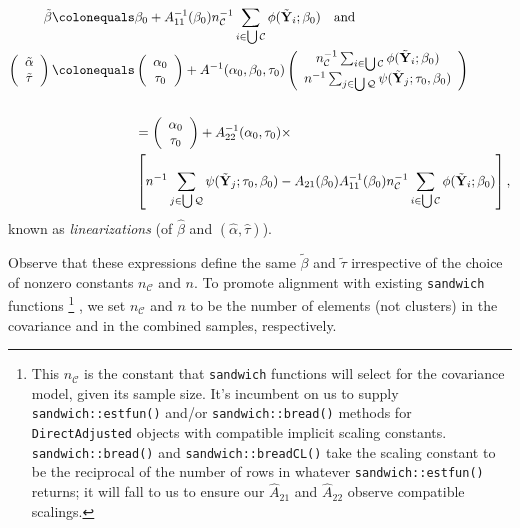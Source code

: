 \documentclass{article}
\newcommand{\defeq}{\ensuremath{\colonequals}}
\begin{document}
  \begin{align*}
   \tilde\beta
    \defeq& \beta_{0} + A_{11}^{-1}(\beta_{0})n_{\mathcal{C}}^{-1}\sum_{i\in \bigcup \mathcal{C}}\phi(\tilde{\mathbf{Y}}_{i}; \beta_{0})
  \quad \text{and}\\
    \left(\begin{array}{c}\tilde\alpha\\ \tilde\tau \end{array}\right)
    \defeq& \left(\begin{array}{c}\alpha_{0}\\
                    \tau_{0} \end{array}\right)
    + A^{-1}(\alpha_{0}, \beta_{0}, \tau_{0})\left(
    \begin{array}{c}
      n_{\mathcal{C}}^{-1}\sum_{i\in \bigcup
      \mathcal{C}}\phi(\tilde{\mathbf{Y}}_{i}; \beta_{0})\\
      n^{-1}\sum_{j\in \bigcup
                 \mathcal{Q}}\psi(\tilde{\mathbf{Y}}_{j};
                 \tau_{0},\beta_{0} )
    \end{array}
\right)\\
    \\
               &=\left(\begin{array}{c}\alpha_{0}\\
                         \tau_{0} \end{array}\right) +
    A_{22}^{-1}(\alpha_{0}, \tau_{0})\times \\
    & \left[
                 n^{-1}\sum_{j\in \bigcup
                 \mathcal{Q}}\psi(\tilde{\mathbf{Y}}_{j};
                 \tau_{0},\beta_{0} ) - A_{21}(\beta_{0}) A_{11}^{-1}(\beta_{0})n_{\mathcal{C}}^{-1}\sum_{i\in \bigcup \mathcal{C}}\phi(\tilde{\mathbf{Y}}_{i}; \beta_{0})\right],
\end{align*}
known as \textit{linearizations} (of $\hat\beta$ and $(\hat\alpha, \hat\tau)$).


Observe that these expressions define the same $\tilde\beta$ and $\tilde\tau$
  irrespective of the choice of nonzero constants $n_{\mathcal{C}}$
  and $n$.  To promote alignment with existing \texttt{sandwich}
  functions%
  \footnote{%
    This $n_{\mathcal{C}}$ is the constant that \texttt{sandwich} functions
will select for the covariance model, given its sample size.  It's
incumbent on us to supply \texttt{sandwich::estfun()} and/or
\texttt{sandwich::bread()} methods for \texttt{DirectAdjusted} objects
with compatible implicit
scaling constants. \texttt{sandwich::bread()} and
\texttt{sandwich::breadCL()} take the scaling constant to be the
reciprocal of the number of rows in whatever
\texttt{sandwich::estfun()} returns; it will fall to us to ensure our
$\hat{A}_{21}$ and $\hat{A}_{22}$ observe compatible scalings.}%
, we set $n_{\mathcal{C}}$ and $n$ to be the number of elements
(not clusters) in the covariance and in the combined samples,
respectively.
\end{document}
